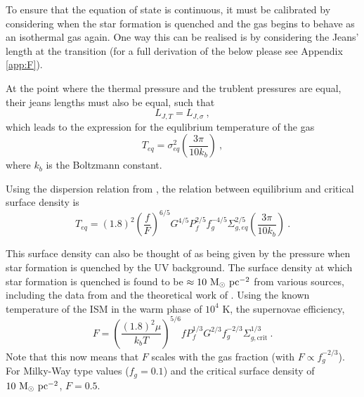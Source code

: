 To ensure that the equation of state is continuous, it must be calibrated by considering when the star formation is quenched and the gas begins to behave as an isothermal gas again.
One way this can be realised is by considering the Jeans' length at the transition (for a full derivation of the below please see Appendix \ref{app:F}).

At the point where the thermal pressure and the trublent pressures are equal, their jeans lengths must also be equal, such that
$$
     L_{J, T} = L_{J, \sigma}~,
$$
which leads to the expression for the equlibrium temperature of the gas
\begin{equation}
    T_{eq} = \sigma^2_{eq} \left(\frac{3 \pi}{10 k_b}\right)~,
    \label{eqn:teq}
\end{equation}
where $k_b$ is the Boltzmann constant.

Using the dispersion relation from \citet{martizzi_supernova_2015}, the relation between equilibrium and critical surface density is
$$
  T_{eq} = (1.8)^2 \left(\frac{f}{F}\right)^{6/5} G^{4/5} P_f^{2/5} f_g^{-4/5} \Sigma_{g, eq}^{2/5} \left(\frac{3\pi}{10k_b}\right)~.
$$

This surface density can also be thought of as being given by the pressure when star formation is quenched by the UV background.
The surface density at which star formation is quenched is found to be $\approx 10 ~\mathrm{M}_{\odot} ~\mathrm{pc}^{-2}$ from various sources, including the data from \citet{bigiel_star_2008} and the theoretical work of \citet{schaye_star_2004}.
Using the known temperature of the ISM in the warm phase of $10^{4}$ K, the supernovae efficiency,
\begin{equation}
    F = \left(\frac{(1.8)^2 \mu}{k_b T}\right)^{5/6} f P_f^{1/3} G^{2/3} f_g^{-2/3} \Sigma_{g, \mathrm{crit}}^{1/3}~.
    \label{eqn:Fcalib}
\end{equation}
Note that this now means that $F$ scales with the gas fraction (with $F \propto f_g^{-2/3}$).
For Milky-Way type values ($f_g = 0.1$) and the critical surface density of $10 ~\mathrm{M}_{\odot} ~\mathrm{pc}^{-2}$, $F=0.5$.
